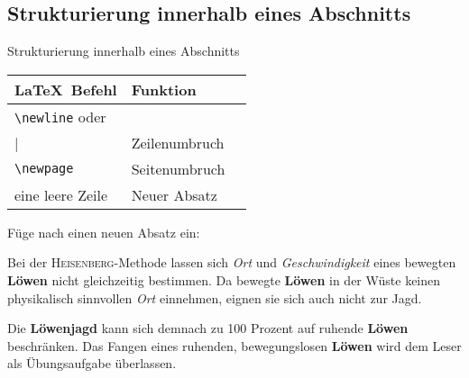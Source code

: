 \subsection{Strukturierung innerhalb eines Abschnitts}
\begin{frame}[c]
	\begin{center}
		\large Strukturierung innerhalb eines Abschnitts
	\end{center}
\end{frame}
\begin{frame}[fragile]
	\Befehle
	\begin{center}
		\begin{tabular}{lll}
			\toprule
			\LaTeX\ Befehl								&	Funktion			\\ \midrule
			\lstinline|\newline| oder \lstinline|\\|	&	Zeilenumbruch		\\
			\lstinline|\newpage|						&	Seitenumbruch		\\
			eine leere Zeile							&	Neuer Absatz		\\ \bottomrule
		\end{tabular}
	\end{center}
	\pause\btVFill
	\Aufgabee
	Füge nach  einen neuen Absatz ein: 
	\begin{outputbox}
		Bei der \textsc{Heisenberg}-Methode lassen sich \textit{Ort} und \textit{Geschwindigkeit} eines bewegten \textbf{Löwen} nicht gleichzeitig bestimmen. Da bewegte \textbf{Löwen} in der Wüste keinen physikalisch sinnvollen \textit{Ort} einnehmen, eignen sie sich auch nicht zur Jagd.
		
		Die \textbf{Löwenjagd} kann sich demnach zu 100 Prozent auf ruhende \textbf{Löwen} beschränken. Das Fangen eines ruhenden, bewegungslosen \textbf{Löwen} wird dem Leser als Übungsaufgabe überlassen.
	\end{outputbox}
	\vspace{0.3cm}
\end{frame}
